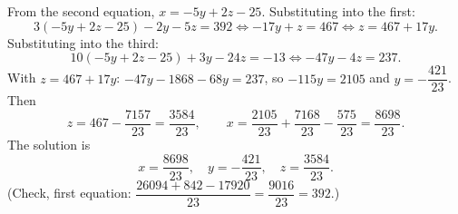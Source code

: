 From the second equation, $x=-5y+2z-25$. Substituting into the first:
\[3(-5y+2z-25)-2y-5z=392\iff-17y+z=467\iff z=467+17y.\]
Substituting into the third:
\[10(-5y+2z-25)+3y-24z=-13\iff-47y-4z=237.\]
With $z=467+17y$: $-47y-1868-68y=237$, so $-115y=2105$ and $y=-\dfrac{421}{23}$. Then
\[z=467-\dfrac{7157}{23}=\dfrac{3584}{23},\qquad x=\dfrac{2105}{23}+\dfrac{7168}{23}-\dfrac{575}{23}=\dfrac{8698}{23}.\]
The solution is
\[\boxed{x=\dfrac{8698}{23},\quad y=-\dfrac{421}{23},\quad z=\dfrac{3584}{23}}.\]
(Check, first equation: $\dfrac{26094+842-17920}{23}=\dfrac{9016}{23}=392$.)

